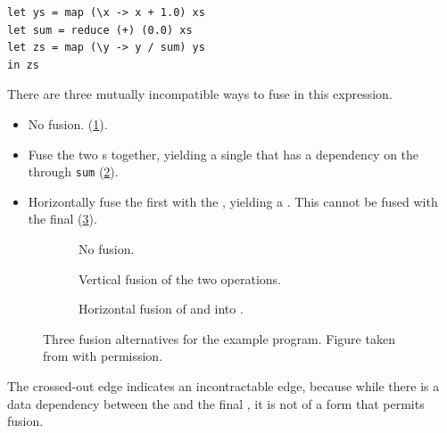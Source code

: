 \begin{lstlisting}
let ys = map (\x -> x + 1.0) xs
let sum = reduce (+) (0.0) xs
let zs = map (\y -> y / sum) ys
in zs
\end{lstlisting}

There are three mutually incompatible ways to fuse in this expression.

\begin{itemize}
\item No fusion. (\cref{fig:three-fusion-no-fusion}).
\item Fuse the two s together, yielding a single  that
  has a dependency on the  through \texttt{sum}
  (\cref{fig:three-fusion-map-map}).
\item Horizontally fuse the first  with the ,
  yielding a .  This  cannot be fused with the
  final  (\cref{fig:three-fusion-map-reduce}).
\end{itemize}

\begin{figure}
  \centering

  \begin{subfigure}[t]{0.32\textwidth}
      
      \caption{No fusion.}
      \label{fig:three-fusion-no-fusion}
  \end{subfigure}
  \begin{subfigure}[t]{0.32\textwidth}
    
    \caption{Vertical fusion of the two  operations.}
      \label{fig:three-fusion-map-map}
  \end{subfigure}
  \begin{subfigure}[t]{0.32\textwidth}
    
    \caption{Horizontal fusion of  and  into .}
      \label{fig:three-fusion-map-reduce}
  \end{subfigure}


  \caption{Three fusion alternatives for the example program. Figure
    taken from \cite{dybdal2017array} with permission.}
  \label{fig:three-fusion-opportunities}
\end{figure}

The crossed-out edge indicates an incontractable edge, because while
there is a data dependency between the  and the final
, it is not of a form that permits fusion.

